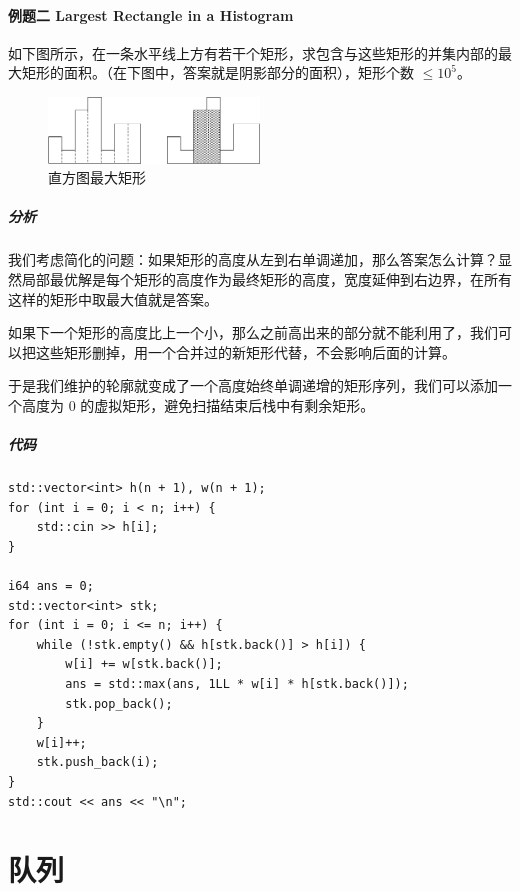 \documentclass{report}
\begin{document}
\subsubsection{例题二 Largest Rectangle in a Histogram}

如下图所示，在一条水平线上方有若干个矩形，求包含与这些矩形的并集内部的最大矩形的面积。（在下图中，答案就是阴影部分的面积），矩形个数 $\le 10^5$。

\begin{figure}[ht]
    \centering
    \includegraphics[width=0.5\textwidth]{./pic/rectangle.png}
    \caption{直方图最大矩形}
\end{figure}

\paragraph{分析}

我们考虑简化的问题：如果矩形的高度从左到右单调递加，那么答案怎么计算？显然局部最优解是每个矩形的高度作为最终矩形的高度，宽度延伸到右边界，在所有这样的矩形中取最大值就是答案。

如果下一个矩形的高度比上一个小，那么之前高出来的部分就不能利用了，我们可以把这些矩形删掉，用一个合并过的新矩形代替，不会影响后面的计算。

于是我们维护的轮廓就变成了一个高度始终单调递增的矩形序列，我们可以添加一个高度为 $0$ 的虚拟矩形，避免扫描结束后栈中有剩余矩形。

\paragraph{代码}

\begin{verbatim}
std::vector<int> h(n + 1), w(n + 1);
for (int i = 0; i < n; i++) {
    std::cin >> h[i];
}

i64 ans = 0;
std::vector<int> stk;
for (int i = 0; i <= n; i++) {
    while (!stk.empty() && h[stk.back()] > h[i]) {
        w[i] += w[stk.back()];
        ans = std::max(ans, 1LL * w[i] * h[stk.back()]);
        stk.pop_back();
    }
    w[i]++;
    stk.push_back(i);
}
std::cout << ans << "\n";
\end{verbatim}

\newpage

\chapter{队列}
\end{document}
